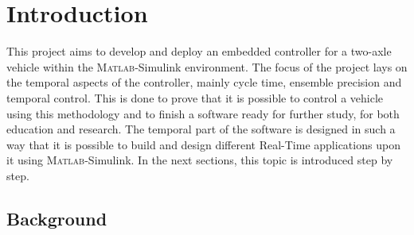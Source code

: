 \documentclass[table,xcdraw]{article}
\begin{document}

\newpage


\tableofcontents


\newpage
{}

\section{Introduction}
This project aims to develop and deploy an embedded controller for a two-axle vehicle within the \textsc{Matlab}-Simulink environment. The focus of the project lays on the temporal aspects of the controller, mainly cycle time, ensemble precision and temporal control. This is done to prove that it is possible to control a vehicle using this methodology and to finish a software ready for further study, for both education and research. The temporal part of the software is designed in such a way that it is possible to build and design different Real-Time applications upon it using \textsc{Matlab}-Simulink. In the next sections, this topic is introduced step by step.

\subsection{Background}

\end{document}
